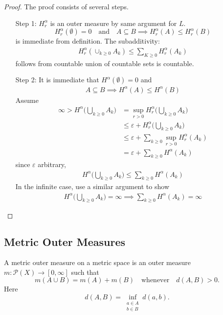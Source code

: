 \begin{proof} The proof consists of several steps.
	\begin{enumerate}
		\item[Step 1:] $H_{r}^{\alpha}$ is an outer measure by same argument for $L$.
			\[
				H_{r}^{\alpha} (\emptyset)= 0 \quad \text{and} \quad A \subseteq B \implies H_{r}^{\alpha} (A) \leq H_{r}^{\alpha} (B)
			\]
			is immediate from definition.
			The subadditivity:
			\begin{align*}
			H_{r}^{\alpha} ( \cup_{k \geq 0} A_{k}) \leq \sum_{K \geq 0} H_{r}^{\alpha} (A_k)
			\end{align*} follows from countable union of countable sets is countable.

		\item[Step 2:] It is immediate that $H^{\alpha} (\emptyset) = 0$ and
			\begin{align*}
			A \subseteq B \implies H^{\alpha} (A) \leq H^{\alpha}(B)
			\end{align*} Assume
			\begin{align*}
				\infty > H^{\alpha} \bigg( \bigcup_{k \geq 0} A_k \bigg) &= \sup_{r > 0} H_{r}^{\alpha} \bigg( \bigcup_{k \geq 0} A_k \bigg) \\
																&\leq \varepsilon + H_{r}^{\alpha} \bigg( \bigcup_{k \geq 0} A_k \bigg) \\
																&\leq \varepsilon + \sum_{k \geq 0} \sup_{r > 0} H_{r}^{\alpha} ( A_k) \\
																&= \varepsilon + \sum_{k \geq 0} H^{\alpha} ( A_k)
			\end{align*}
			since $\varepsilon$ arbitrary,
			\begin{align*}
				H^{\alpha} \bigg( \bigcup_{k \geq 0} A_k \bigg) \leq \sum_{k \geq 0} H^{\alpha} ( A_k)
			\end{align*}
			In the infinite case, use a similar argument to show
			\begin{align*}
				H^{\alpha} \bigg( \bigcup_{k \geq 0} A_k \bigg) = \infty \implies \sum_{k \geq 0} H^{\alpha} ( A_k) = \infty
			\end{align*}
	\end{enumerate}
\end{proof}

\subsection{Metric Outer Measures}

\begin{definition}
	A metric outer measure on a metric space is an outer measure $m : \mathcal{P}(X) \to [0,\infty]$ such that
	\[
		m(A \cup B) = m(A) + m(B) \quad \text{whenever} \quad d(A,B) > 0.
	\]
	Here
	\[
		d(A,B) = \inf_{\substack{a \in A \\ b \in B}} d(a,b).
	\]
\end{definition}

